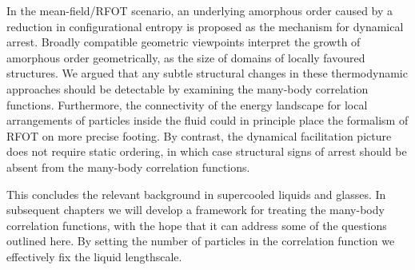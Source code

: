 \documentclass[11pt,twoside]{report}
\def\includebibliography{}
\begin{document}
In the mean-field/RFOT scenario, an underlying amorphous order caused by a reduction in configurational entropy is proposed as the mechanism for dynamical arrest.
Broadly compatible geometric viewpoints interpret the growth of amorphous order geometrically, as the size of domains of locally favoured structures.
We argued that any subtle structural changes in these thermodynamic approaches should be detectable by examining the many-body correlation functions.
Furthermore, the connectivity of the energy landscape for local arrangements of particles inside the fluid could in principle place the formalism of RFOT on more precise footing.
By contrast, the dynamical facilitation picture does not require static ordering, in which case structural signs of arrest should be absent from the many-body correlation functions.

This concludes the relevant background in supercooled liquids and glasses.
In subsequent chapters we will develop a framework for treating the many-body correlation functions, with the hope that it can address some of the questions outlined here.
By setting the number of particles in the correlation function we effectively fix the liquid lengthscale.%

\ifdefined\includebibliography
  \printbibliography
\fi
\end{document}
